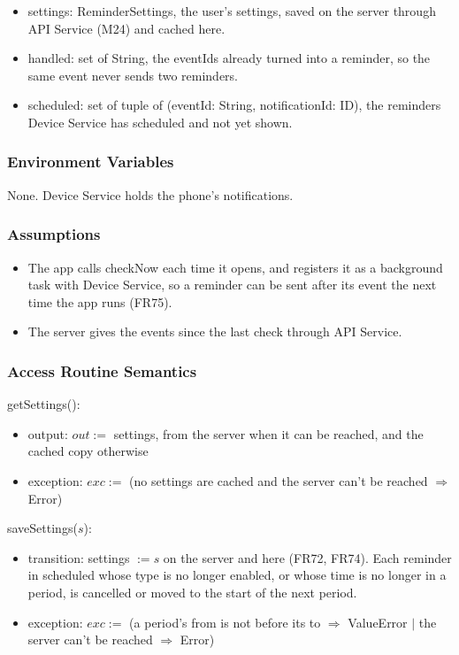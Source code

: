 \documentclass[12pt, titlepage]{article}
\begin{document}
\begin{itemize}
\item settings: ReminderSettings, the user's settings, saved on the server
  through API Service (M24) and cached here.
\item handled: set of String, the eventIds already turned into a reminder, so
  the same event never sends two reminders.
\item scheduled: set of tuple of (eventId: String, notificationId: ID), the
  reminders Device Service has scheduled and not yet shown.
\end{itemize}

\subsubsection{Environment Variables}

None. Device Service holds the phone's notifications.

\subsubsection{Assumptions}

\begin{itemize}
\item The app calls checkNow each time it opens, and registers it as a
  background task with Device Service, so a reminder can be sent after its
  event the next time the app runs (FR75).
\item The server gives the events since the last check through API Service.
\end{itemize}

\subsubsection{Access Routine Semantics}

\noindent getSettings():
\begin{itemize}
\item output: $out :=$ settings, from the server when it can be reached, and
  the cached copy otherwise
\item exception: $exc :=$ (no settings are cached and the server can't be
  reached $\Rightarrow$ Error)
\end{itemize}

\noindent saveSettings($s$):
\begin{itemize}
\item transition: settings $:= s$ on the server and here (FR72, FR74). Each
  reminder in scheduled whose type is no longer enabled, or whose time is no
  longer in a period, is cancelled or moved to the start of the next period.
\item exception: $exc :=$ (a period's from is not before its to
  $\Rightarrow$ ValueError $|$ the server can't be reached $\Rightarrow$
  Error)
\end{itemize}
\end{document}
